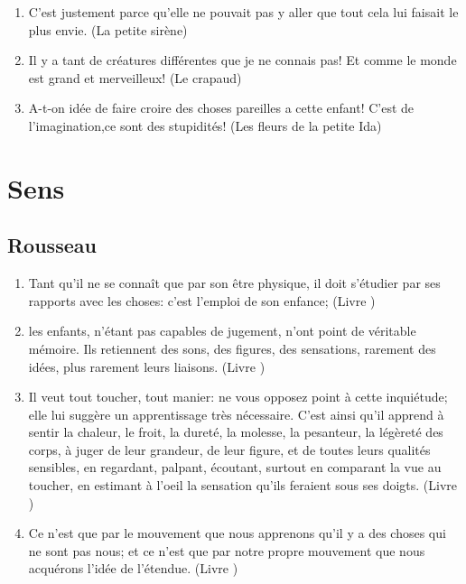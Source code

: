 \documentclass[a4paper, 11pt, hidelinks]{article}
\newcommand{\rb}[1]{\Romanbar{#1}}
\begin{document}
\begin{enumerate}
    \item C'est justement parce qu'elle ne pouvait pas y aller que tout cela lui faisait le plus envie. (La petite sirène)
    \item Il y a tant de créatures différentes que je ne connais pas! Et comme le monde est grand et merveilleux! (Le crapaud)
    \item A-t-on idée de faire croire des choses pareilles a cette enfant! C'est de l'imagination,ce sont des stupidités! (Les fleurs de la petite Ida)
\end{enumerate}





























\section{Sens}



\subsection{Rousseau}


\begin{enumerate}
    \item Tant qu'il ne se connaît que par son être physique, il doit s'étudier par ses rapports avec les choses: c'est l'emploi de son enfance; (Livre \rb{2})
    \item les enfants, n'étant pas capables de jugement, n'ont point de véritable mémoire. Ils retiennent des sons, des figures, des sensations, rarement des idées, plus rarement leurs liaisons. (Livre \rb{2})
    \item Il veut tout toucher, tout manier: ne vous opposez point à cette inquiétude; elle lui suggère un apprentissage très nécessaire. C'est ainsi qu'il apprend à sentir la chaleur, le froit, la dureté, la molesse, la pesanteur, la légèreté des corps, à juger de leur grandeur, de leur figure, et de toutes leurs qualités sensibles, en regardant, palpant, écoutant, surtout en comparant la vue au toucher, en estimant à l'oeil la sensation qu'ils feraient sous ses doigts. (Livre \rb{1})
    \item Ce n'est que par le mouvement que nous apprenons qu'il y a des choses qui ne sont pas nous; et ce n'est que par notre propre mouvement que nous acquérons l'idée de l'étendue. (Livre \rb{1})
\end{enumerate}
\end{document}
